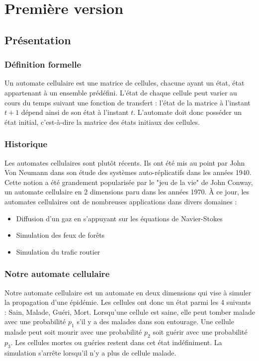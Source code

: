 \documentclass{article}
\begin{document}
\section{Première version}

\subsection{Présentation}

\subsubsection{Définition formelle}
	Un automate cellulaire est une matrice de cellules, chacune ayant un état, état appartenant à un ensemble prédéfini. L'état de chaque cellule peut varier au cours du temps suivant une fonction de transfert : l'état de la matrice à l'instant $t+1$ dépend ainsi de son état à l'instant $t$. L'automate doit donc posséder un état initial, c'est-à-dire la matrice des états initiaux des cellules.

\subsubsection{Historique}
	Les automates cellulaires sont plutôt récents. Ils ont été mis au point par John Von Neumann dans son étude des systèmes auto-réplicatifs dans les années 1940. Cette notion a été grandement popularisée par le "jeu de la vie" de John Conway, un automate cellulaire en 2 dimensions paru dans les années 1970. À ce jour, les automates cellulaires ont de nombreuses applications dans divers domaines :
	\begin{itemize}
	\item Diffusion d'un gaz en s'appuyant sur les équations de Navier-Stokes
	\item Simulation des feux de forêts
	\item Simulation du trafic routier
	\end{itemize}

\subsubsection{Notre automate cellulaire}
	Notre automate cellulaire est un automate en deux dimensions qui vise à simuler la propagation d'une épidémie. Les cellules ont donc un état parmi les 4 suivants : Sain, Malade, Guéri, Mort. Lorsqu'une cellule est saine, elle peut tomber malade avec une probabilité $p_1$ s'il y a des malades dans son entourage. Une cellule malade peut soit mourir avec une probabilité $p_2$ soit guérir avec une probabilité $p_3$. Les cellules mortes ou guéries restent dans cet état indéfiniment. La simulation s'arrête lorsqu'il n'y a plus de cellule malade.
\end{document}
